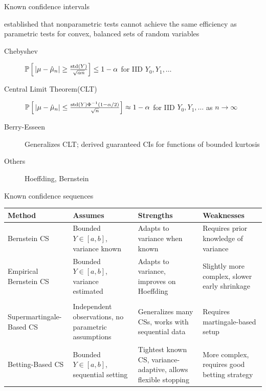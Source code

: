 \documentclass[11pt,compress,xcolor={usenames,dvipsnames},aspectratio=169]{beamer}
\begin{document}
\begin{frame}{Known confidence intervals}

\vspace{-6ex}

\cite{BahSav56} established that nonparametric tests cannot achieve the same efficiency as parametric tests for convex, balanced sets of random variables

\begin{description}
    \item[Chebyshev] $\operatorname{\mathbb{P}} \Big[\left \lvert \mu - \hat{\mu}_n \right \rvert \ge \frac{\operatorname{std}(Y)}{\sqrt{\alpha n}} \Bigr] \le 1 - \alpha$  for IID $Y_0, Y_1, \ldots$

    \item[Central Limit Theorem(CLT)]
    $\operatorname{\mathbb{P}} \Big[\left \lvert \mu - \hat{\mu}_n \right \rvert \le \frac{\operatorname{std}(Y) \Phi^{-1}(1 -  \alpha/2)}{\sqrt{n}} \Bigr] \approx 1 - \alpha$  for IID $Y_0, Y_1, \ldots$ as $n \to \infty$

    \item[Berry-Esseen] Generalizes CLT; \textcite{HicEtal14a} derived guaranteed CIs  for functions of bounded kurtosis

    \item[Others] Hoeffding, Bernstein 
\end{description}
   
\end{frame}



\begin{frame}{Known confidence sequences}

 \vspace{-5ex}
\begin{tabular}
    {
    >{\raggedright\small}p{} 
    >{\raggedright\small}p{}
    >{\raggedright\small}p{} 
    >{\raggedright\small}p{}
    }
        \textbf{Method} & \textbf{Assumes} & \textbf{Strengths} & \textbf{Weaknesses} \tabularnewline
        \toprule
        Bernstein CS & Bounded $Y \in [a,b]$, variance known & Adapts to variance when known & Requires prior knowledge of variance \tabularnewline
        \midrule
        Empirical Bernstein CS & Bounded $Y \in [a,b]$, variance estimated & Adapts to variance, improves on Hoeffding & Slightly more complex, slower early shrinkage \\
        \tabularnewline
        \midrule
        Supermartingale-Based CS \parencite{HowEtal21a} & Independent observations, no parametric assumptions & Generalizes many CSs, works with sequential data & Requires martingale-based setup \tabularnewline
        \midrule
        Betting-Based CS \parencite{WauRam24a} & Bounded $Y \in [a,b]$, sequential setting & Tightest known CS, variance-adaptive, allows flexible stopping & More complex, requires good betting strategy \tabularnewline
        \bottomrule
    \end{tabular}

\end{frame}
\end{document}
